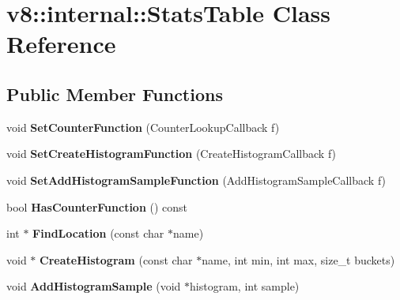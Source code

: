 \hypertarget{classv8_1_1internal_1_1_stats_table}{}\section{v8\+:\+:internal\+:\+:Stats\+Table Class Reference}
\label{classv8_1_1internal_1_1_stats_table}
\subsection*{Public Member Functions}
\begin{DoxyCompactItemize}
\item 
void {\bfseries Set\+Counter\+Function} (Counter\+Lookup\+Callback f)\hypertarget{classv8_1_1internal_1_1_stats_table_a8b3d3e6111d0e6fc92e2c5fac1d7bf63}{}\label{classv8_1_1internal_1_1_stats_table_a8b3d3e6111d0e6fc92e2c5fac1d7bf63}

\item 
void {\bfseries Set\+Create\+Histogram\+Function} (Create\+Histogram\+Callback f)\hypertarget{classv8_1_1internal_1_1_stats_table_aed9d933a4c6b5f41a43e53d9d9f6fac8}{}\label{classv8_1_1internal_1_1_stats_table_aed9d933a4c6b5f41a43e53d9d9f6fac8}

\item 
void {\bfseries Set\+Add\+Histogram\+Sample\+Function} (Add\+Histogram\+Sample\+Callback f)\hypertarget{classv8_1_1internal_1_1_stats_table_a91179b8d1c0e9f9ec3761ca189925dfb}{}\label{classv8_1_1internal_1_1_stats_table_a91179b8d1c0e9f9ec3761ca189925dfb}

\item 
bool {\bfseries Has\+Counter\+Function} () const \hypertarget{classv8_1_1internal_1_1_stats_table_a45ba0dee73756de7a975820331e470c4}{}\label{classv8_1_1internal_1_1_stats_table_a45ba0dee73756de7a975820331e470c4}

\item 
int $\ast$ {\bfseries Find\+Location} (const char $\ast$name)\hypertarget{classv8_1_1internal_1_1_stats_table_a2f44cca1e2acf134a52485e02c79e70c}{}\label{classv8_1_1internal_1_1_stats_table_a2f44cca1e2acf134a52485e02c79e70c}

\item 
void $\ast$ {\bfseries Create\+Histogram} (const char $\ast$name, int min, int max, size\+\_\+t buckets)\hypertarget{classv8_1_1internal_1_1_stats_table_a0dd8ef255a6791a7132f44b4360ed68b}{}\label{classv8_1_1internal_1_1_stats_table_a0dd8ef255a6791a7132f44b4360ed68b}

\item 
void {\bfseries Add\+Histogram\+Sample} (void $\ast$histogram, int sample)\hypertarget{classv8_1_1internal_1_1_stats_table_a225a48909c94185e3a5f7b7f39bb33e1}{}\label{classv8_1_1internal_1_1_stats_table_a225a48909c94185e3a5f7b7f39bb33e1}

\end{DoxyCompactItemize}
